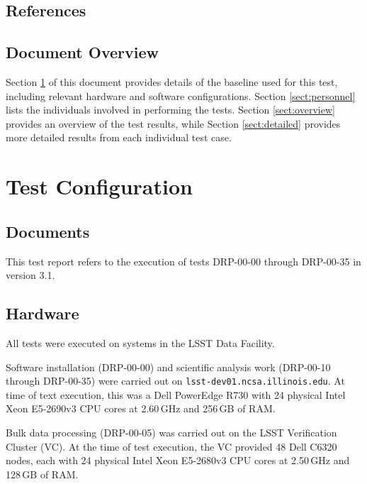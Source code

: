 \documentclass[DM,STR,toc]{lsstdoc}
\begin{document}
\subsection{References}
\label{sect:references}

\renewcommand{\refname}{}


\subsection{Document Overview}
\label{sect:docoverview}

Section \ref{sect:configuration} of this document provides details of the \product{} baseline used for this test, including relevant hardware and software configurations.
Section \ref{sect:personnel} lists the individuals involved in performing the tests.
Section \ref{sect:overview} provides an overview of the test results, while Section \ref{sect:detailed} provides more detailed results from each individual test case.

\section{Test Configuration}
\label{sect:configuration}

\subsection{Documents}

This test report refers to the execution of tests DRP-00-00 through DRP-00-35 in  version 3.1.

\subsection{Hardware}
\label{sect:hwconf}

All tests were executed on systems in the LSST Data Facility.

Software installation (DRP-00-00) and scientific analysis work (DRP-00-10 through DRP-00-35) were carried out on \texttt{lsst-dev01.ncsa.illinois.edu}.
At time of text execution, this was a Dell PowerEdge R730 with 24 physical Intel Xeon E5-2690v3 CPU cores at 2.60\,GHz and 256\,GB of RAM.

Bulk data processing (DRP-00-05) was carried out on the LSST Verification Cluster (VC).
At the time of test execution, the VC provided 48 Dell C6320 nodes, each with 24 physical Intel Xeon E5-2680v3 CPU cores at 2.50\,GHz and 128\,GB of RAM.
\end{document}
